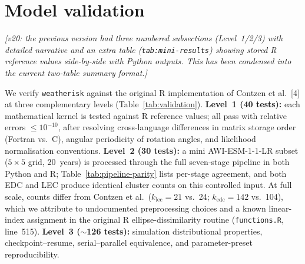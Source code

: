 \documentclass[preprint,12pt,a4paper]{elsarticle}
\newcommand{\rev}[1]{{#1}}
\newcommand{\revn}[1]{{\color{RevisionViolet}#1}}
\begin{document}
\FloatBarrier


\rev{\section{Model validation}
\label{sec:validation}}

\revn{\textit{[v20: the previous version had three numbered subsections (Level~1/2/3) with detailed narrative and an extra table (\texttt{tab:mini-results}) showing stored R reference values side-by-side with Python outputs. This has been condensed into the current two-table summary format.]}}

\rev{We verify \texttt{weatherisk} against the original R implementation
of Contzen et al.~[4] at three complementary levels
(Table~\ref{tab:validation}).
\textbf{Level~1 (40 tests):} each mathematical kernel is tested
against R reference values; all pass with relative errors
$\leq 10^{-10}$, after resolving cross-language differences in
matrix storage order (Fortran vs.\ C), angular periodicity of
rotation angles, and likelihood normalisation conventions.
\textbf{Level~2 (30 tests):} a mini AWI-ESM-1-1-LR subset
($5{\times}5$ grid, 20~years) is processed through the full
seven-stage pipeline in both Python and R;
Table~\ref{tab:pipeline-parity} lists per-stage agreement, and
both EDC and LEC produce identical cluster counts on this
controlled input.  At full scale, counts differ from Contzen
et al.\ ($k_{\text{lec}}=21$ vs.\ 24; $k_{\text{edc}}=142$
vs.\ 104), which we attribute to undocumented preprocessing
choices and a known linear-index assignment in the original R
ellipse-dissimilarity routine (\texttt{functions.R}, line~515).
\textbf{Level~3 ($\sim$126 tests):} simulation distributional
properties, checkpoint--resume, serial--parallel equivalence,
and parameter-preset reproducibility.

}
\end{document}
